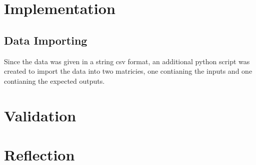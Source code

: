 \documentclass[10pt]{article}
\begin{document}
\section{Implementation}
\subsection{Data Importing}
Since the data was given in a string csv format, an additional python script was created to import the data into two matricies, one contianing the inputs and one contianing the expected outputs.
\section{Validation}
\section{Reflection}
\end{document}
